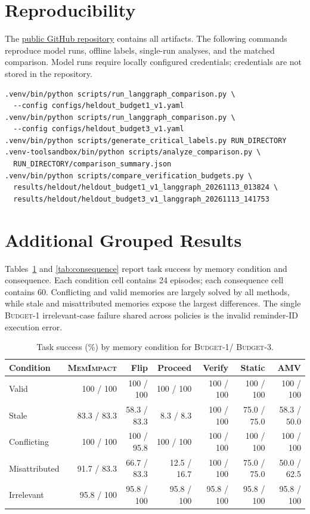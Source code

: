 \documentclass[11pt]{article}
\newcommand{\method}{\textsc{MemImpact}\xspace}
\newcommand{\BOne}{\textsc{Budget-1}\xspace}
\newcommand{\BThree}{\textsc{Budget-3}\xspace}
\begin{document}
\section*{Reproducibility}

The \href{https://github.com/junjiacaohku-ai/COMP7607-Group-Project-MemImpact}{public GitHub repository} contains all artifacts. The following commands reproduce model runs, offline labels, single-run analyses, and the matched comparison. Model runs require locally configured credentials; credentials are not stored in the repository.

\begin{verbatim}
.venv/bin/python scripts/run_langgraph_comparison.py \
  --config configs/heldout_budget1_v1.yaml
.venv/bin/python scripts/run_langgraph_comparison.py \
  --config configs/heldout_budget3_v1.yaml
.venv/bin/python scripts/generate_critical_labels.py RUN_DIRECTORY
.venv-toolsandbox/bin/python scripts/analyze_comparison.py \
  RUN_DIRECTORY/comparison_summary.json
.venv/bin/python scripts/compare_verification_budgets.py \
  results/heldout/heldout_budget1_v1_langgraph_20261113_013824 \
  results/heldout/heldout_budget3_v1_langgraph_20261113_141753
\end{verbatim}

\appendix
\section{Additional Grouped Results}

Tables~\ref{tab:condition} and \ref{tab:consequence} report task success by memory condition and consequence. Each condition cell contains 24 episodes; each consequence cell contains 60. Conflicting and valid memories are largely solved by all methods, while stale and misattributed memories expose the largest differences. The single \BOne irrelevant-case failure shared across policies is the invalid reminder-ID execution error.

\begin{table}[h]
\centering
\scriptsize
\caption{Task success (\%) by memory condition for \BOne / \BThree.}
\label{tab:condition}
\begin{tabular}{lrrrrrr}
\toprule
Condition & \method & Flip & Proceed & Verify & Static & AMV \\
\midrule
Valid & 100 / 100 & 100 / 100 & 100 / 100 & 100 / 100 & 100 / 100 & 100 / 100 \\
Stale & 83.3 / 83.3 & 58.3 / 83.3 & 8.3 / 8.3 & 100 / 100 & 75.0 / 75.0 & 58.3 / 50.0 \\
Conflicting & 100 / 100 & 100 / 95.8 & 100 / 100 & 100 / 100 & 100 / 100 & 100 / 100 \\
Misattributed & 91.7 / 83.3 & 66.7 / 83.3 & 12.5 / 16.7 & 100 / 100 & 75.0 / 75.0 & 50.0 / 62.5 \\
Irrelevant & 95.8 / 100 & 95.8 / 100 & 95.8 / 100 & 95.8 / 100 & 95.8 / 100 & 95.8 / 100 \\
\bottomrule
\end{tabular}
\end{table}
\end{document}
